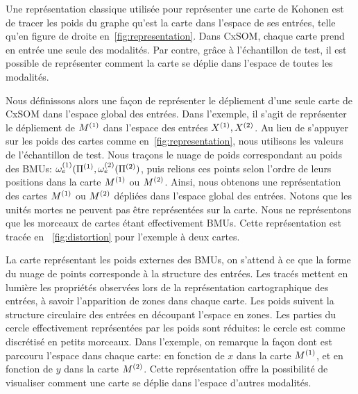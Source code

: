 \documentclass[../main]{subfiles}
\begin{document}
Une représentation classique utilisée pour représenter une carte de Kohonen est de tracer les poids du graphe qu'est la carte dans l'espace de ses entrées, telle qu'en figure de droite en~\ref{fig:representation}. Dans CxSOM, chaque carte prend en entrée une seule des modalités. Par contre, grâce à l'échantillon de test, il est possible de représenter comment la carte se déplie dans l'espace de toutes les modalités.

Nous définissons alors une façon de représenter le dépliement d'une seule carte de CxSOM dans l'espace global des entrées. Dans l'exemple, il s'agit de représenter le dépliement de $M^{({1})}$ dans l'espace des entrées $X^{({1})},X^{({2})}$.
Au lieu de s'appuyer sur les poids des cartes comme en~\ref{fig:representation}, nous utilisons les valeurs de l'échantillon de test. Nous traçons le nuage de poids correspondant au poids des BMUs: $\omega_e^{({1})}(\Pi^{({1})},\omega_e^{({2})}(\Pi^{({2})})$, puis relions ces points selon l'ordre de leurs positions dans la carte $M^{({1})}$ ou $M^{({2})}$. Ainsi, nous obtenons une représentation des cartes $M^{({1})}$ ou $M^{({2})}$ dépliées dans l'espace global des entrées. 
Notons que les unités mortes ne peuvent pas être représentées sur la carte. Nous ne représentons que les morceaux de cartes étant effectivement BMUs. 
Cette représentation est tracée en ~\ref{fig:distortion} pour l'exemple à deux cartes.


La carte représentant les poids externes des BMUs, on s'attend à ce que la forme du nuage de points corresponde à la structure des entrées.
Les tracés mettent en lumière les propriétés observées lors de la représentation cartographique des entrées, à savoir l'apparition de zones dans chaque carte. Les poids suivent la structure circulaire des entrées en découpant l'espace en zones. Les parties du cercle effectivement représentées par les poids sont réduites: le cercle est comme discrétisé en petits morceaux.
Dans l'exemple, on remarque la façon dont est parcouru l'espace dans chaque carte: en fonction de $x$ dans la carte $M^{({1})}$, et en fonction de $y$ dans la carte $M^{({2})}$. 
Cette représentation offre la possibilité  de visualiser comment une carte se déplie dans l'espace d'autres modalités.
\end{document}
